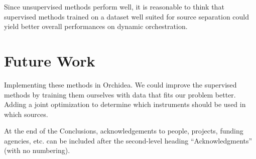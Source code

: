 \documentclass{article}
\begin{document}
	Since unsupervised methods perform well, it is reasonable to think that supervised methods trained on a dataset well suited for source separation could yield better overall performances on dynamic orchestration.
	
	\section{Future Work}\label{sec:futurework}
	Implementing these methods in Orchidea. We could improve the supervised methods by training them ourselves with data that fits our problem better. Adding a joint optimization to determine which instruments should be used in which sources.
	
	\begin{acknowledgments}
		At the end of the Conclusions, acknowledgements to people, projects, funding agencies, etc. can be included after the second-level heading  ``Acknowledgments'' (with no numbering).
	\end{acknowledgments} 
	
	
	
\end{document}
